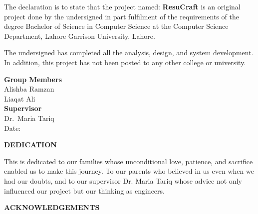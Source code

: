 \documentclass[12pt, a4paper, oneside]{report}
\begin{document}
\indent The declaration is to state that the project named: \textbf{ResuCraft} is an original project done by the undersigned in part fulfilment of the requirements of the degree Bachelor of Science in Computer Science at the Computer Science Department, Lahore Garrison University, Lahore.

\indent The undersigned has completed all the analysis, design, and system development. In addition, this project has not been posted to any other college or university.

\vspace{2cm}
\noindent\textbf{Group Members}\\[1cm]
Alishba Ramzan \hspace{3cm} \underline{\hspace{5cm}}\\[0.8cm]
Liaqat Ali \hspace{4.2cm} \underline{\hspace{5cm}}\\[1.5cm]

\noindent\textbf{Supervisor}\\[0.5cm]
Dr.\ Maria Tariq \hspace{3.2cm} \underline{\hspace{5cm}}\\[0.5cm]
Date: \underline{\hspace{5cm}}

\newpage
\begin{center}
  {\Large \textbf{DEDICATION}}
\end{center}

\indent
This is dedicated to our families whose unconditional love, patience, and sacrifice enabled us to make this journey. To our parents who believed in us even when we had our doubts, and to our supervisor Dr. Maria Tariq whose advice not only influenced our project but our thinking as engineers.



\newpage
\begin{center}
  {\Large \textbf{ACKNOWLEDGEMENTS}}
\end{center}
\end{document}
